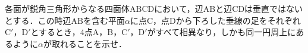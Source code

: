 各面が鋭角三角形からなる四面体$\mathrm{ABCD}$において，辺$\mathrm{AB}$と辺$\mathrm{CD}$は垂直ではないとする．この時辺$\mathrm{AB}$を含む平面$\alpha$に点$\mathrm{C}$，点$\mathrm{D}$から下ろした垂線の足をそれぞれ$\mathrm{C}'$，$\mathrm{D}'$とするとき，$4$点$\mathrm{A}$，$\mathrm{B}$，$\mathrm{C}'$，$\mathrm{D}'$がすべて相異なり，しかも同一円周上にあるように$\alpha$が取れることを示せ．
